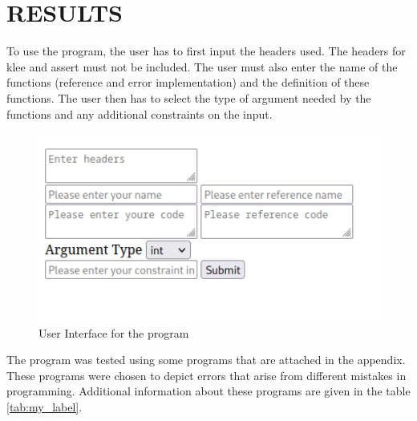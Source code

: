 
\chapter{\uppercase{Results}} %
\label{chap5} %
To use the program, the user has to first input the headers used. The headers for klee and assert must not be included. The user must also enter the name of the functions (reference and error implementation) and the definition of these functions. The user then has to select the type of argument needed by the functions and any additional constraints on the input.\\
\begin{figure}[h]
\centering
\includegraphics[width=1\textwidth]{5/ui.png}
\caption{User Interface for the program}
\label{fig:ui}
\end{figure}
The program was tested using some programs that are attached in the appendix. These programs were chosen to depict errors that arise from different mistakes in programming. Additional information about these programs are given in the table \ref{tab:my_label}. \\\\

